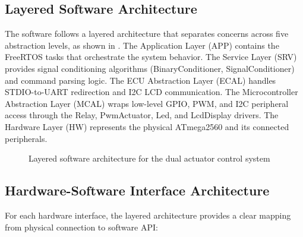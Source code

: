 \subsection{Layered Software Architecture}

The software follows a layered architecture that separates concerns across five abstraction levels, as shown in . The Application Layer (APP) contains the FreeRTOS tasks that orchestrate the system behavior. The Service Layer (SRV) provides signal conditioning algorithms (BinaryConditioner, SignalConditioner) and command parsing logic. The ECU Abstraction Layer (ECAL) handles STDIO-to-UART redirection and I2C LCD communication. The Microcontroller Abstraction Layer (MCAL) wraps low-level GPIO, PWM, and I2C peripheral access through the Relay, PwmActuator, Led, and LcdDisplay drivers. The Hardware Layer (HW) represents the physical ATmega2560 and its connected peripherals.

\begin{figure}[H]
\centering
{}
\caption{Layered software architecture for the dual actuator control system}
\label{fig:layered_architecture}
\end{figure}

\subsection{Hardware-Software Interface Architecture}

For each hardware interface, the layered architecture provides a clear mapping from physical connection to software API:


